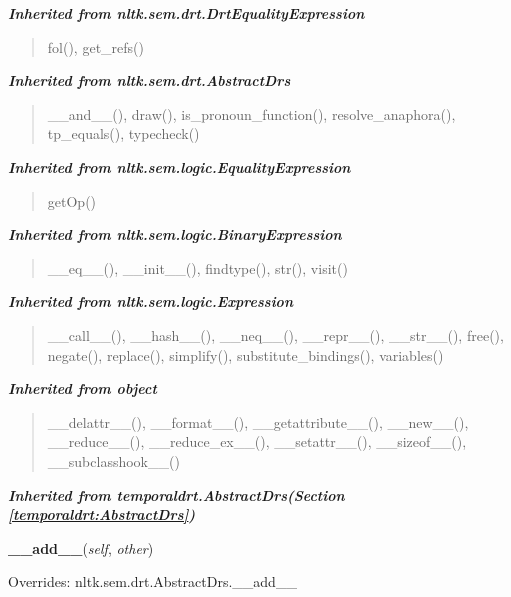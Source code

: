 \large{\textbf{\textit{Inherited from nltk.sem.drt.DrtEqualityExpression}}}

\begin{quote}
fol(), get\_refs()
\end{quote}

\large{\textbf{\textit{Inherited from nltk.sem.drt.AbstractDrs}}}

\begin{quote}
\_\_and\_\_(), draw(), is\_pronoun\_function(), resolve\_anaphora(), tp\_equals(), typecheck()
\end{quote}

\large{\textbf{\textit{Inherited from nltk.sem.logic.EqualityExpression}}}

\begin{quote}
getOp()
\end{quote}

\large{\textbf{\textit{Inherited from nltk.sem.logic.BinaryExpression}}}

\begin{quote}
\_\_eq\_\_(), \_\_init\_\_(), findtype(), str(), visit()
\end{quote}

\large{\textbf{\textit{Inherited from nltk.sem.logic.Expression}}}

\begin{quote}
\_\_call\_\_(), \_\_hash\_\_(), \_\_neq\_\_(), \_\_repr\_\_(), \_\_str\_\_(), free(), negate(), replace(), simplify(), substitute\_bindings(), variables()
\end{quote}

\large{\textbf{\textit{Inherited from object}}}

\begin{quote}
\_\_delattr\_\_(), \_\_format\_\_(), \_\_getattribute\_\_(), \_\_new\_\_(), \_\_reduce\_\_(), \_\_reduce\_ex\_\_(), \_\_setattr\_\_(), \_\_sizeof\_\_(), \_\_subclasshook\_\_()
\end{quote}

\large{\textbf{\textit{Inherited from temporaldrt.AbstractDrs\textit{(Section \ref{temporaldrt:AbstractDrs})}}}}

    \vspace{0.5ex}

\hspace{.8\funcindent}\begin{boxedminipage}{\funcwidth}

    \raggedright \textbf{\_\_add\_\_}(\textit{self}, \textit{other})

\setlength{\parskip}{2ex}
\setlength{\parskip}{1ex}
      Overrides: nltk.sem.drt.AbstractDrs.\_\_add\_\_

    \end{boxedminipage}

